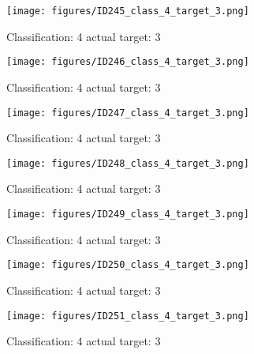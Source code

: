 \begin{figure}[h!]
\begin{center}
\texttt{[image: figures/ID245\_class\_4\_target\_3.png]}
\end{center}
\caption{ Classification: 4 actual target: 3}
\label{fig:ID245_class_4_target_3}
\end{figure}
\begin{figure}[h!]
\begin{center}
\texttt{[image: figures/ID246\_class\_4\_target\_3.png]}
\end{center}
\caption{ Classification: 4 actual target: 3}
\label{fig:ID246_class_4_target_3}
\end{figure}
\begin{figure}[h!]
\begin{center}
\texttt{[image: figures/ID247\_class\_4\_target\_3.png]}
\end{center}
\caption{ Classification: 4 actual target: 3}
\label{fig:ID247_class_4_target_3}
\end{figure}
\begin{figure}[h!]
\begin{center}
\texttt{[image: figures/ID248\_class\_4\_target\_3.png]}
\end{center}
\caption{ Classification: 4 actual target: 3}
\label{fig:ID248_class_4_target_3}
\end{figure}
\begin{figure}[h!]
\begin{center}
\texttt{[image: figures/ID249\_class\_4\_target\_3.png]}
\end{center}
\caption{ Classification: 4 actual target: 3}
\label{fig:ID249_class_4_target_3}
\end{figure}
\begin{figure}[h!]
\begin{center}
\texttt{[image: figures/ID250\_class\_4\_target\_3.png]}
\end{center}
\caption{ Classification: 4 actual target: 3}
\label{fig:ID250_class_4_target_3}
\end{figure}
\begin{figure}[h!]
\begin{center}
\texttt{[image: figures/ID251\_class\_4\_target\_3.png]}
\end{center}
\caption{ Classification: 4 actual target: 3}
\label{fig:ID251_class_4_target_3}
\end{figure}

